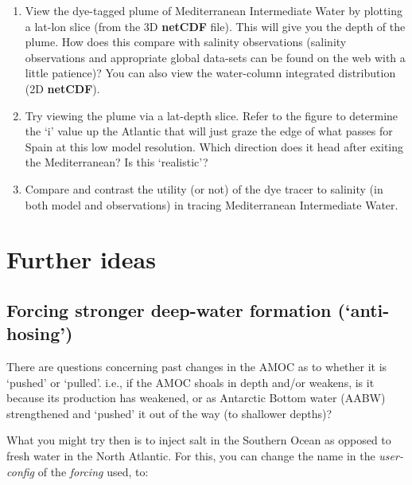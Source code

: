 \vspace{1mm}
\begin{enumerate}[noitemsep]
\vspace{1mm}
\item View the dye-tagged plume of Mediterranean Intermediate Water by plotting a lat-lon slice (from the 3D \textbf{netCDF} file). This will give you the depth of the plume. How does this compare with salinity observations (salinity observations and appropriate global data-sets can be found on the web with a little patience)? You can also view the water-column integrated distribution (2D \textbf{netCDF}).
\vspace{1mm}
\item Try viewing the plume via a lat-depth slice. Refer to the figure to determine the ‘i’ value up the Atlantic that will just graze the edge of what passes for Spain at this low model resolution. Which direction does it head after exiting the Mediterranean? Is this ‘realistic’?
\vspace{1mm}
\item Compare and contrast the utility (or not) of the dye tracer to salinity (in both model and observations) in tracing  Mediterranean Intermediate Water.
\end{enumerate}

\newpage

\section{Further ideas}


\subsection{Forcing stronger deep-water formation (‘anti-hosing’)}

There are questions concerning past changes in the AMOC as to whether it is ‘pushed’ or ‘pulled’. i.e., if the AMOC shoals in depth and/or weakens, is it because its production has weakened, or as Antarctic Bottom water (AABW) strengthened and ‘pushed’ it out of the way (to shallower depths)?

What you might try then is to inject salt in the Southern Ocean as opposed to fresh water in the North Atlantic. For this, you can change the name in the \textit{user-config} of the \textit{forcing} used, to:

